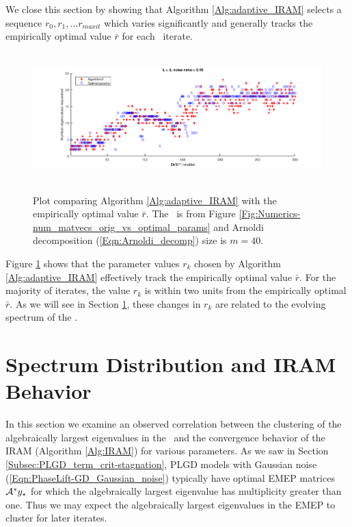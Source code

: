 We close this section by showing that Algorithm \ref{Alg:adaptive_IRAM} selects a sequence $r_0, r_1, \ldots r_{maxit}$ which varies significantly and generally tracks the empirically optimal value $\bar{r}$ for each \emep \ iterate.

\begin{figure}[H]
\centering
\hbox{\hspace{-1.0cm} \includegraphics[scale=0.6]{Numerics-num_eigs_ada_vs_opt_1} }\vspace{0.6cm}
\vspace{0.2cm}
	\caption{
	Plot comparing Algorithm \ref{Alg:adaptive_IRAM} with the empirically optimal value $\bar{r}$.
	 The \emep \ is from Figure \ref{Fig:Numerics-num_matvecs_orig_vs_optimal_params} and Arnoldi decomposition (\ref{Eqn:Arnoldi_decomp}) size is $m=40$.
	}
\label{Fig:Numerics-num_eigs_ada_vs_opt_one_plot}
\end{figure}

Figure \ref{Fig:Numerics-num_eigs_ada_vs_opt_one_plot} shows that the parameter values $r_k$ chosen by Algorithm \ref{Alg:adaptive_IRAM} effectively track the empirically optimal value $\bar{r}$.  
For the majority of iterates, the value $r_k$ is within two units from the empirically optimal $\bar{r}$.
As we will see in Section \ref{Subsec:evol_mats-correl_btwn_EMEP_and_IRAM}, these changes in $r_k$ are related to the evolving spectrum of the \emep.




 


\section{Spectrum Distribution and IRAM Behavior}
\label{Subsec:evol_mats-correl_btwn_EMEP_and_IRAM}



In this section we examine an observed correlation between the clustering of the algebraically largest eigenvalues in the \emep \ and the convergence behavior of the IRAM (Algorithm \ref{Alg:IRAM}) for various parameters.
As we saw in Section \ref{Subsec:PLGD_term_crit-stagnation}, PLGD models with Gaussian noise (\ref{Eqn:PhaseLift-GD_Gaussian_noise}) typically have optimal EMEP matrices ${\mathcal A}^*y_\star$ for which the algebraically largest eigenvalue has multiplicity greater than one.
Thus we may expect the algebraically largest eigenvalues in the EMEP to cluster for later iterates.

